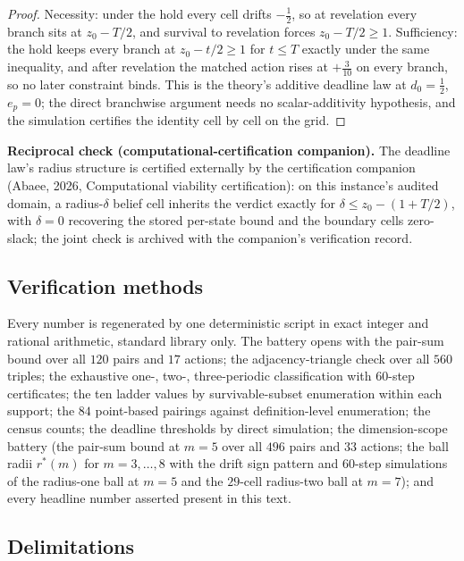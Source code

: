 \documentclass[10pt,twocolumn]{article}
\theoremstyle{plain}
\theoremstyle{definition}
\theoremstyle{remark}
\begin{document}
\begin{proof}
Necessity: under the hold every cell drifts \(-\tfrac12\), so at
revelation every branch sits at \(z_{0} - T/2\), and survival to
revelation forces \(z_{0} - T/2 \ge 1\). Sufficiency: the hold keeps
every branch at \(z_{0} - t/2 \ge 1\) for \(t \le T\) exactly
under the same inequality, and after revelation the matched action
rises at \(+\tfrac3{10}\) on every branch, so no later constraint
binds. This is the theory's additive deadline law at
\(d_{0} = \tfrac12\), \(e_{p} = 0\); the direct branchwise argument
needs no scalar-additivity hypothesis, and the simulation certifies
the identity cell by cell on the grid.
\end{proof}

\medskip
\noindent\textbf{Reciprocal check (computational-certification
companion).} The deadline law's radius structure is certified
externally by the certification companion (Abaee, 2026, Computational viability certification): on this
instance's audited domain, a radius-\(\delta\) belief cell inherits
the verdict exactly for \(\delta \le z_{0} - (1 + T/2)\), with
\(\delta = 0\) recovering the stored per-state bound and the
boundary cells zero-slack; the joint check is archived with the
companion's verification record.

\subsection{Verification methods}\label{methods}

Every number is regenerated by one deterministic script in exact integer and rational arithmetic, standard library only. The battery opens with the pair-sum bound over all \(120\) pairs and \(17\) actions; the
adjacency-triangle check over all \(560\) triples; the exhaustive
one-, two-, three-periodic classification with \(60\)-step
certificates; the ten ladder values by survivable-subset enumeration
within each support; the \(84\) point-based pairings against
definition-level enumeration; the census counts; the deadline
thresholds by direct simulation; the dimension-scope battery (the
pair-sum bound at \(m = 5\) over all \(496\) pairs and \(33\)
actions; the ball radii \(r^{*}(m)\) for \(m = 3, \dots, 8\) with
the drift sign pattern and \(60\)-step simulations of the radius-one
ball at \(m = 5\) and the \(29\)-cell radius-two ball at
\(m = 7\)); and every headline number asserted present in this
text.

\subsection{Delimitations}\label{scope}
\end{document}
